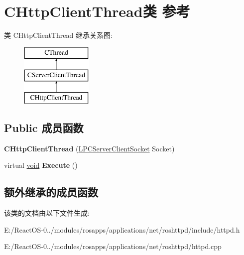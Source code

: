 \hypertarget{class_c_http_client_thread}{}\section{C\+Http\+Client\+Thread类 参考}
\label{class_c_http_client_thread}
类 C\+Http\+Client\+Thread 继承关系图\+:\begin{figure}[H]
\begin{center}
\leavevmode
\includegraphics[height=3.000000cm]{class_c_http_client_thread}
\end{center}
\end{figure}
\subsection*{Public 成员函数}
\begin{DoxyCompactItemize}
\item 
\mbox{\label{class_c_http_client_thread_a99b55783c59fd0732eb398859949c24a}} 
{\bfseries C\+Http\+Client\+Thread} (\hyperlink{class_c_server_client_socket}{L\+P\+C\+Server\+Client\+Socket} Socket)
\item 
\mbox{\label{class_c_http_client_thread_af5aa234891f8ef37e31390e93e48af06}} 
virtual \hyperlink{interfacevoid}{void} {\bfseries Execute} ()
\end{DoxyCompactItemize}
\subsection*{额外继承的成员函数}


该类的文档由以下文件生成\+:\begin{DoxyCompactItemize}
\item 
E\+:/\+React\+O\+S-\/0../modules/rosapps/applications/net/roshttpd/include/httpd.\+h\item 
E\+:/\+React\+O\+S-\/0../modules/rosapps/applications/net/roshttpd/httpd.\+cpp\end{DoxyCompactItemize}
